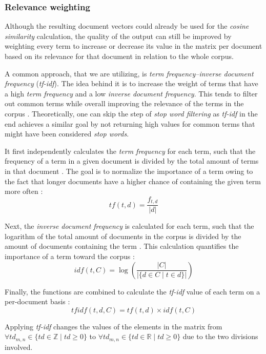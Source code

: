 \documentclass[12pt,a4paper]{report}
\begin{document}
\subsubsection{Relevance weighting}
Although the resulting document vectors could already be used for the
\textit{cosine similarity} calculation, the quality of the output
can still be improved by weighting every term to increase or decrease its value
in the matrix per document based on its relevance for that document in relation
to the whole corpus.

A common approach, that we are utilizing,
is \textit{term frequency–inverse document frequency} (\textit{tf-idf}).
The idea behind it is to increase the weight of terms that have
a high \textit{term frequency} and a low \textit{inverse document frequency}.
This tends to filter out common terms while overall improving the relevance
of the terms in the corpus \cite{robertson2004tfidf, singhal2001ir}.
Theoretically, one can skip the step of \textit{stop word filtering}
as \textit{tf-idf} in the end achieves a similar goal by not returning
high values for common terms that might have been considered \textit{stop words}.

It first independently calculates the \textit{term frequency} for each term,
such that the frequency of a term in a given document is divided by the total
amount of terms in that document \cite{robertson2004tfidf}.
The goal is to normalize the importance of a term owing to the fact
that longer documents have a higher chance of containing the given term
more often \cite{singhal2001ir}:
\[tf(t,d) = \frac{f_{t, d}}{\vert d \vert}\]

Next, the \textit{inverse document frequency} is calculated for each term,
such that the logarithm of the total amount of documents in the corpus
is divided by the amount of documents containing the term \cite{robertson2004tfidf}.
This calculation quantifies the importance of a term toward the corpus \cite{singhal2001ir}:
\[idf(t,C) = \log \left(\frac{\vert C \vert}{\vert \{d \in C \mid t \in d\} \vert}\right)\]

Finally, the functions are combined to calculate the \textit{tf-idf} value
of each term on a per-document basis \cite{robertson2004tfidf}:
\[tfidf(t,d,C) = tf(t,d) \times idf(t,C)\]

Applying \textit{tf-idf} changes the values of the elements in the matrix
from \(\forall td_{m,n} \in \{td \in \mathbb{Z} \mid td \ge 0\}\)
to \(\forall td_{m,n} \in \{td \in \mathbb{R} \mid td \ge 0\}\) due to
the two divisions involved.
\end{document}
